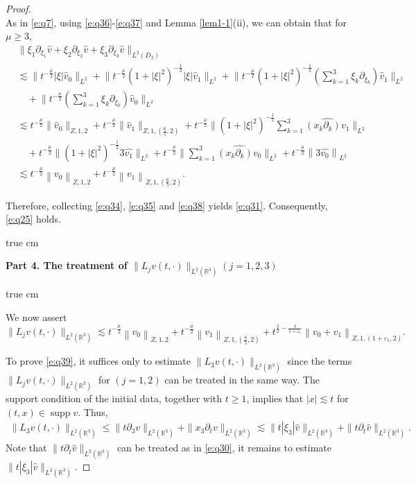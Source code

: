 \documentclass[11pt,twoside]{article}
\newcommand{\R}{\mathbb R}
\newcommand{\p}{\partial}
\newcommand{\f}{\frac}
\theoremstyle{plain}
\theoremstyle{definition}
\theoremstyle{remark}
\numberwithin{equation}{section}
\begin{document}
\begin{proof}
\begin{equation}
\end{equation}
As in \eqref{e:q7}, using \eqref{e:q36}-\eqref{e:q37} and  Lemma \ref{lem1-1}(ii), we can obtain that for $\mu\geq3$,
\begin{equation}\label{e:q38}
\begin{aligned}
&\big\|\xi_1\p_{\xi_1}\hat{v}+\xi_2\p_{\xi_2}\hat{v}+\xi_3\p_{\xi_3}\hat{v}\big\|_{L^2(D_2)}
\\
&\lesssim \big\|t^{-\frac{\mu}{2}}|\xi|\hat{v}_{0}\big\|_{L^{2}}+ \big\|t^{-\frac{\mu}{2}}(1+|\xi|^2)^{-\f12}|\xi|\hat{v}_{1}\big\|_{L^{2}}+ \big\|t^{-\f{\mu}{2}}(1+|\xi|^2)^{-\f12}(\sum_{k=1}^3\xi_k\p_{\xi_k})\hat{v}_{1}\big\|_{L^{2}}\\
&\quad +\big\|t^{-\f{\mu}{2}}(\sum_{k=1}^3\xi_k\p_{\xi_k})\hat{v}_{0}\big\|_{L^{2}}\\
& \lesssim t^{-\frac{\mu}{2}}\big\|\hat{v}_{0}\big\|_{Z, 1, 2}+ t^{-\frac{\mu}{2}}\big\|\hat{v}_{1}\big\|_{Z, 1, (\f{6}{5}, 2)}+ t^{-\f{\mu}{2}}
\big\|(1+|\xi|^2)^{-\f{1}{2}}\sum_{k=1}^3\widehat{(x_k\p_k)v_1}\big\|_{L^{2}}\\
&\quad+ t^{-\f{\mu}{2}} \big\|(1+|\xi|^2)^{-\f{1}{2}}3\widehat{v_1}\big\|_{L^{2}}+t^{-\f{\mu}{2}} \big\|\sum_{k=1}^3\widehat{(x_k\p_k)v_0}\big\|_{L^{2}}+ t^{-\f{\mu}{2}} \left\|3\widehat{v_0}\right\|_{L^{2}}\\
&\lesssim  t^{-\f{\mu}{2}}\left\|v_0\right\|_{Z, 1, 2}+t^{-\f{\mu}{2}}\left\|v_1\right\|_{Z, 1,(\f65, 2)}.
\end{aligned}
\end{equation}



Therefore, collecting \eqref{e:q34}, \eqref{e:q35} and \eqref{e:q38} yields \eqref{e:q31}. Consequently, \eqref{e:q25} holds.

 true cm

{\bf Part 4.  The treatment  of $\|L_jv(t, \cdot)\|_{L^2(\R^3)}(j=1, 2, 3)$ }

 true cm

We now assert
\begin{equation}\label{e:q39}
\|L_jv(t, \cdot)\|_{L^2(\R^3)} \lesssim t^{-\f{\mu}{2}}\left\|v_0\right\|_{Z, 1, 2}+t^{-\f{\mu}{2}}\left\|v_1\right\|_{Z, 1,(\f65, 2)}+t^{\f32-\f{3}{1+\varepsilon_1}}\left\|v_0+v_1\right\|_{Z, 1,(1+\varepsilon_1, 2)}.
\end{equation}


To prove \eqref{e:q39}, it  suffices only to estimate $\|L_3v(t, \cdot)\|_{L^2(\R^3)}$ since the terms $\|L_jv(t, \cdot)\|_{L^2(\R^3)}$ for $(j=1,2)$ can be treated in the same way. The support condition of the initial data, together with $t\geq1$, implies that $|x|\lesssim t$
for $(t, x)\in \operatorname{supp}v$. Thus,
\begin{equation}\label{e:q40}
\begin{aligned}
\|L_3v(t, \cdot)\|_{L^2(\R^3)}\leq \|t\p_3v\|_{L^2(\R^3)}+\|x_3\p_tv\|_{L^2(\R^3)}
\lesssim \|t|\xi_3|\hat{v}\|_{L^2(\R^3)}+\|t\p_t\hat{v}\|_{L^2(\R^3)}.
\end{aligned}
\end{equation}
Note that $\|t\p_t\hat{v}\|_{L^2(\R^3)}$ can be treated as in \eqref{e:q30},
it remains to estimate $\|t|\xi_3|\hat{v}\|_{L^2(\R^3)}$.


\end{proof}
\end{document}
